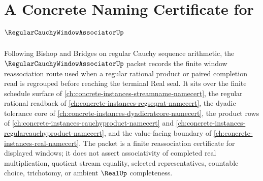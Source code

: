 \chapter{A Concrete Naming Certificate for $\RegularCauchyWindowAssociatorUp$}
\label{ch:concrete-instances-regular-cauchy-window-associator-namecert}

Following Bishop and Bridges on regular Cauchy sequence arithmetic, the $\RegularCauchyWindowAssociatorUp$ packet records the finite window reassociation route used when a regular rational product or paired completion read is regrouped before reaching the terminal Real seal. It sits over the finite schedule surface of \autoref{ch:concrete-instances-streamname-namecert}, the regular rational readback of \autoref{ch:concrete-instances-regseqrat-namecert}, the dyadic tolerance core of \autoref{ch:concrete-instances-dyadicratcore-namecert}, the product rows of \autoref{ch:concrete-instances-cauchyproduct-namecert} and \autoref{ch:concrete-instances-regularcauchyproduct-namecert}, and the value-facing boundary of \autoref{ch:concrete-instances-real-namecert}. The packet is a finite reassociation certificate for displayed windows; it does not assert associativity of completed real multiplication, quotient stream equality, selected representatives, countable choice, trichotomy, or ambient $\RealUp$ completeness.

